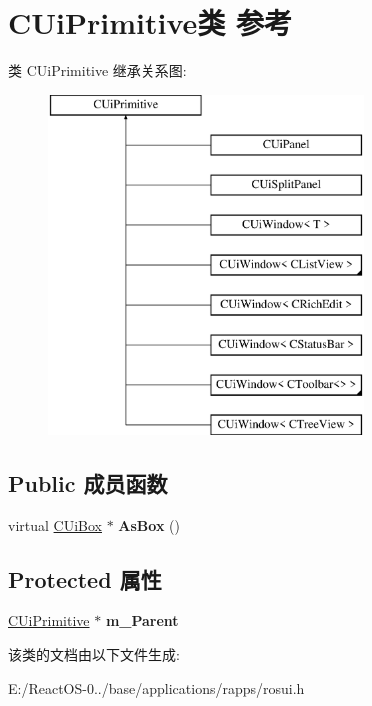\hypertarget{class_c_ui_primitive}{}\section{C\+Ui\+Primitive类 参考}
\label{class_c_ui_primitive}
类 C\+Ui\+Primitive 继承关系图\+:\begin{figure}[H]
\begin{center}
\leavevmode
\includegraphics[height=9.000000cm]{class_c_ui_primitive}
\end{center}
\end{figure}
\subsection*{Public 成员函数}
\begin{DoxyCompactItemize}
\item 
\mbox{\label{class_c_ui_primitive_adb29c620d2a73b8d797b17d1821cd18b}} 
virtual \hyperlink{class_c_ui_box}{C\+Ui\+Box} $\ast$ {\bfseries As\+Box} ()
\end{DoxyCompactItemize}
\subsection*{Protected 属性}
\begin{DoxyCompactItemize}
\item 
\mbox{\label{class_c_ui_primitive_ace24b8df8fa8e91288beca9d7b5f7c56}} 
\hyperlink{class_c_ui_primitive}{C\+Ui\+Primitive} $\ast$ {\bfseries m\+\_\+\+Parent}
\end{DoxyCompactItemize}


该类的文档由以下文件生成\+:\begin{DoxyCompactItemize}
\item 
E\+:/\+React\+O\+S-\/0../base/applications/rapps/rosui.\+h\end{DoxyCompactItemize}
